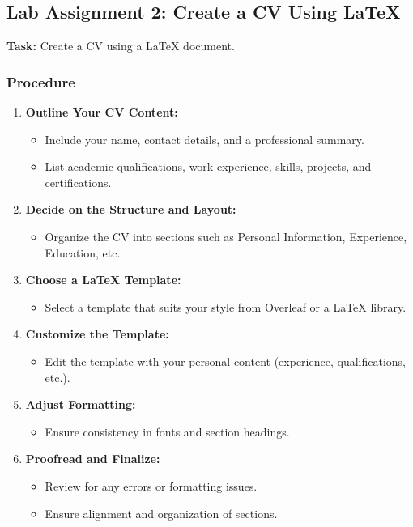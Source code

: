 \documentclass[a4paper,12pt]{article}
\begin{document}
\subsection{Lab Assignment 2: Create a CV Using LaTeX}

\textbf{Task:} Create a CV using a LaTeX document.

\subsubsection*{Procedure}
\begin{enumerate}[label=\arabic*.]
    \item \textbf{Outline Your CV Content:}
    \begin{itemize}
        \item Include your name, contact details, and a professional summary.
        \item List academic qualifications, work experience, skills, projects, and certifications.
    \end{itemize}

    \item \textbf{Decide on the Structure and Layout:}
    \begin{itemize}
        \item Organize the CV into sections such as Personal Information, Experience, Education, etc.
    \end{itemize}

    \item \textbf{Choose a LaTeX Template:}
    \begin{itemize}
        \item Select a template that suits your style from Overleaf or a LaTeX library.
    \end{itemize}

    \item \textbf{Customize the Template:}
    \begin{itemize}
        \item Edit the template with your personal content (experience, qualifications, etc.).
    \end{itemize}

    \item \textbf{Adjust Formatting:}
    \begin{itemize}
        \item Ensure consistency in fonts and section headings.
    \end{itemize}

    \item \textbf{Proofread and Finalize:}
    \begin{itemize}
        \item Review for any errors or formatting issues.
        \item Ensure alignment and organization of sections.
    \end{itemize}


\end{enumerate}
\end{document}
